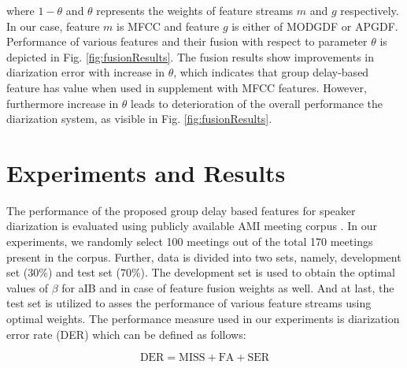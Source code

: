 \documentclass[conference]{IEEEtran}
\begin{document}
where $1-\theta$ and $\theta$ represents the weights of feature streams $m$ and $g$ respectively. In our case, feature $m$ is MFCC and feature 
$g$ is either of MODGDF or APGDF. Performance of various features and their fusion 
with respect to parameter $\theta$ is depicted in Fig. \ref{fig:fusionResults}. The fusion results 
show improvements in diarization error with increase in $\theta$, which indicates that group delay-based 
feature has value when used in supplement with MFCC features. However, furthermore increase in $\theta$ leads to deterioration of the overall performance the diarization system, as visible in Fig. \ref{fig:fusionResults}.   



\section{Experiments and Results }
\label{experimentsNresults}

The performance of the proposed group delay based features for
speaker diarization is evaluated using publicly available AMI meeting corpus \cite{AMIData}. In
our experiments, we randomly select 100 meetings out of the total 170 meetings present in
the corpus. Further, data is divided into two sets, namely, development set ($30\%$) and test set ($70\%$).
The development set is used to obtain the optimal values of $\beta$ for aIB and
in case of feature fusion weights as well. And at last, the test set is utilized
to asses the performance of various feature streams using optimal weights. The
performance measure used in our experiments is diarization error rate (DER)
which can be defined as follows: 

\begin{equation}
\text{DER} = \text{MISS} + \text{FA} + \text{SER}
\end{equation}

\end{document}
